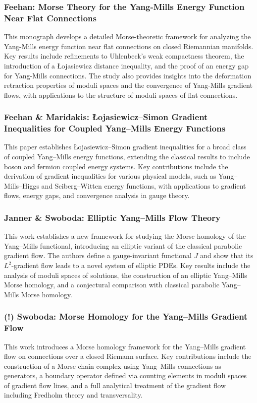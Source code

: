 \documentclass[10pt, letterpaper]{article}
\theoremstyle{custom}
\theoremstyle{definition}
\begin{document}
\subsubsection{Feehan: Morse Theory for the Yang-Mills Energy Function Near Flat Connections \cite{feehan2024morse}} 
This monograph develops a detailed Morse-theoretic framework for analyzing the Yang-Mills energy function near flat connections on closed Riemannian manifolds. Key results include refinements to Uhlenbeck's weak compactness theorem, the introduction of a \L{}ojasiewicz distance inequality, and the proof of an energy gap for Yang-Mills connections. The study also provides insights into the deformation retraction properties of moduli spaces and the convergence of Yang-Mills gradient flows, with applications to the structure of moduli spaces of flat connections.


\subsubsection{Feehan \& Maridakis: \L{}ojasiewicz–Simon Gradient Inequalities for Coupled Yang–Mills Energy Functions \cite{feehan2019lojasiewicz}} 
This paper establishes \L{}ojasiewicz–Simon gradient inequalities for a broad class of coupled Yang–Mills energy functions, extending the classical results to include boson and fermion coupled energy systems. Key contributions include the derivation of gradient inequalities for various physical models, such as Yang–Mills–Higgs and Seiberg–Witten energy functions, with applications to gradient flows, energy gaps, and convergence analysis in gauge theory.



\subsubsection{Janner \& Swoboda: Elliptic Yang–Mills Flow Theory \cite{janner2013elliptic}} 
This work establishes a new framework for studying the Morse homology of the Yang–Mills functional, introducing an elliptic variant of the classical parabolic gradient flow. The authors define a gauge-invariant functional \( J \) and show that its \( L^2 \)-gradient flow leads to a novel system of elliptic PDEs. Key results include the analysis of moduli spaces of solutions, the construction of an elliptic Yang–Mills Morse homology, and a conjectural comparison with classical parabolic Yang–Mills Morse homology.


\subsubsection{(!) Swoboda: Morse Homology for the Yang–Mills Gradient Flow \cite{swoboda2018morse}} 
This work introduces a Morse homology framework for the Yang–Mills gradient flow on connections over a closed Riemann surface. Key contributions include the construction of a Morse chain complex using Yang–Mills connections as generators, a boundary operator defined via counting elements in moduli spaces of gradient flow lines, and a full analytical treatment of the gradient flow including Fredholm theory and transversality.
\end{document}
